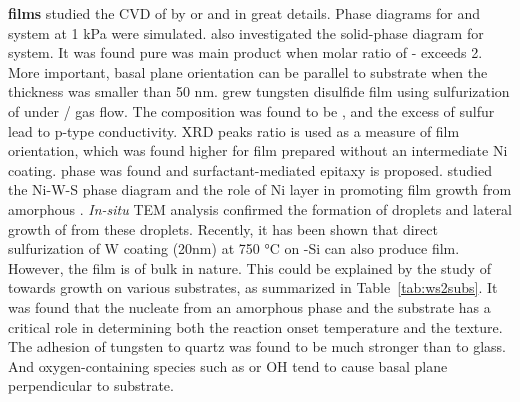 \textbf{ films} \citeauthor{Lee1994} studied the CVD of  by  or  and  in great details. Phase diagrams for  and  system at 1 kPa were simulated.\cite{Lee1994} \citeauthor{Endler1999} also investigated the solid-phase diagram for  system.\cite{Endler1999} It was found pure  was main product when molar ratio of - exceeds 2. More important,  basal plane orientation can be parallel to substrate when the thickness was smaller than 50 nm. \citeauthor{Ennaoui1995a} grew tungsten disulfide film using sulfurization of  under / gas flow.\cite{Ennaoui1995a} The composition was found to be , and the excess of sulfur lead to p-type conductivity. XRD peaks ratio is used as a measure of film orientation, which was found higher for film prepared without an intermediate Ni coating.  phase was found and surfactant-mediated epitaxy is proposed. \citeauthor{Regula1997} studied the Ni-W-S phase diagram and the role of Ni layer in promoting  film growth from amorphous .\cite{Regula1997} \emph{In-situ} TEM analysis confirmed the formation of  droplets and lateral growth of  from these droplets.\cite{Regula1998} Recently, it has been shown that direct sulfurization of W coating (20nm) at 750 \si{\degreeCelsius} on -Si can also produce  film.\cite{Shanmugam2012a} However, the film is of bulk in nature. This could be explained by the study of \citeauthor{Genut1992} towards  growth on various substrates,\cite{Genut1992} as summarized in Table~\ref{tab:ws2subs}. It was found that the  nucleate from an amorphous  phase and the substrate has a critical role in determining both the reaction onset temperature and the texture. The adhesion of tungsten to quartz was found to be much stronger than to glass. And oxygen-containing species such as  or OH tend to cause  basal plane perpendicular to substrate.
